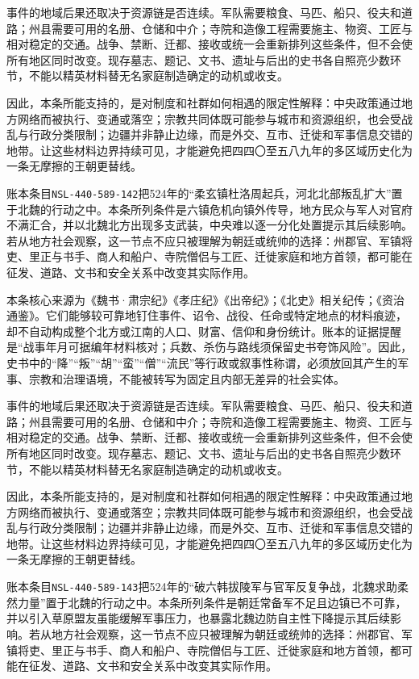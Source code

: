 事件的地域后果还取决于资源链是否连续。军队需要粮食、马匹、船只、役夫和道路；州县需要可用的名册、仓储和中介；寺院和造像工程需要施主、物资、工匠与相对稳定的交通。战争、禁断、迁都、接收或统一会重新排列这些条件，但不会使所有地区同时改变。现存墓志、题记、文书、遗址与后出的史书各自照亮少数环节，不能以精英材料替无名家庭制造确定的动机或收支。

因此，本条所能支持的，是对制度和社群如何相遇的限定性解释：中央政策通过地方网络而被执行、变通或落空；宗教共同体既可能参与城市和资源组织，也会受战乱与行政分类限制；边疆并非静止边缘，而是外交、互市、迁徙和军事信息交错的地带。让这些材料边界持续可见，才能避免把四四〇至五八九年的多区域历史化为一条无摩擦的王朝更替线。

账本条目\texttt{NSL-440-589-142}把524年的“柔玄镇杜洛周起兵，河北北部叛乱扩大”置于北魏的行动之中。本条所列条件是六镇危机向镇外传导，地方民众与军人对官府不满汇合，并以北魏北方出现多支武装，中央难以逐一分化处置提示其后续影响。若从地方社会观察，这一节点不应只被理解为朝廷或统帅的选择：州郡官、军镇将吏、里正与书手、商人和船户、寺院僧侣与工匠、迁徙家庭和地方首领，都可能在征发、道路、文书和安全关系中改变其实际作用。

本条核心来源为《魏书·肃宗纪》《孝庄纪》《出帝纪》；《北史》相关纪传；《资治通鉴》。它们能够较可靠地钉住事件、诏令、战役、任命或特定地点的材料痕迹，却不自动构成整个北方或江南的人口、财富、信仰和身份统计。账本的证据提醒是“战事年月可据编年材料核对；兵数、杀伤与路线须保留史书夸饰风险”。因此，史书中的“降”“叛”“胡”“蛮”“僧”“流民”等行政或叙事性称谓，必须放回其产生的军事、宗教和治理语境，不能被转写为固定且内部无差异的社会实体。

事件的地域后果还取决于资源链是否连续。军队需要粮食、马匹、船只、役夫和道路；州县需要可用的名册、仓储和中介；寺院和造像工程需要施主、物资、工匠与相对稳定的交通。战争、禁断、迁都、接收或统一会重新排列这些条件，但不会使所有地区同时改变。现存墓志、题记、文书、遗址与后出的史书各自照亮少数环节，不能以精英材料替无名家庭制造确定的动机或收支。

因此，本条所能支持的，是对制度和社群如何相遇的限定性解释：中央政策通过地方网络而被执行、变通或落空；宗教共同体既可能参与城市和资源组织，也会受战乱与行政分类限制；边疆并非静止边缘，而是外交、互市、迁徙和军事信息交错的地带。让这些材料边界持续可见，才能避免把四四〇至五八九年的多区域历史化为一条无摩擦的王朝更替线。

账本条目\texttt{NSL-440-589-143}把524年的“破六韩拔陵军与官军反复争战，北魏求助柔然力量”置于北魏的行动之中。本条所列条件是朝廷常备军不足且边镇已不可靠，并以引入草原盟友虽能缓解军事压力，也暴露北魏边防自主性下降提示其后续影响。若从地方社会观察，这一节点不应只被理解为朝廷或统帅的选择：州郡官、军镇将吏、里正与书手、商人和船户、寺院僧侣与工匠、迁徙家庭和地方首领，都可能在征发、道路、文书和安全关系中改变其实际作用。

